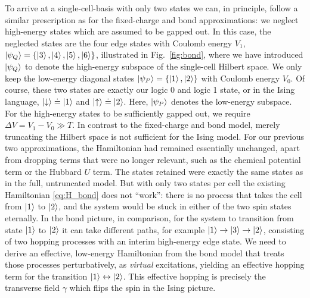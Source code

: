 To arrive at a single-cell-basis with only two states we can, in principle,
follow a similar prescription as for the fixed-charge and bond approximations:
we neglect high-energy states which are assumed to be gapped out. In this case,
the neglected states are the four edge states with Coulomb energy $V_1$,
$\left|\psi_Q\right> = \left\{ \left|3\right>, \left|4\right>, \left|5\right>, \left|6\right> \right\}$,
illustrated in Fig.~\ref{fig:bond}, where we have introduced $\left|\psi_Q\right>$ to
denote the high-energy subspace of the single-cell Hilbert space. We only keep
the low-energy diagonal states $\left|\psi_P\right> = \left\{ \left|1\right>, \left|2\right>
\right\}$ with Coulomb energy $V_0$. Of course, these two states are exactly our
logic 0 and logic 1 state, or in the Ising language, $\left|\downarrow\right> \doteq
\left|1\right>$ and $\left|\uparrow\right> \doteq \left|2\right>$. Here, $\left|\psi_P\right>$ denotes the
low-energy subspace. For the high-energy states to be sufficiently gapped out,
we require $\Delta V = V_1 - V_0 \gg T$. In contrast to the fixed-charge and
bond model, merely truncating the Hilbert space is not sufficient for the Ising
model. For our previous two approximations, the Hamiltonian had remained
essentially unchanged, apart from dropping terms that were no longer relevant, such as the
chemical potential term or the Hubbard $U$ term. The states retained were
exactly the same states as in the full, untruncated model. But with only two
states per cell the existing Hamiltonian \eqref{eq:H_bond} does not ``work'':
there is no process that takes the cell from $\left|1\right>$ to $\left|2\right>$, and the
system would be stuck in either of the two spin states eternally. In the bond
picture, in comparison, for the system to transition from state $\left|1\right>$ to
$\left|2\right>$ it can take different paths, for example $\left|1\right> \rightarrow \left|3\right>
\rightarrow \left|2\right>$, consisting of two hopping processes with an interim
high-energy edge state. We need to derive an effective, low-energy Hamiltonian
from the bond model that treats those processes perturbatively, as
\emph{virtual} excitations, yielding an effective hopping term for the
transition $\left|1\right> \leftrightarrow \left|2\right>$. This effective hopping is
precisely the transverse field $\gamma$ which flips the spin in the Ising
picture.

